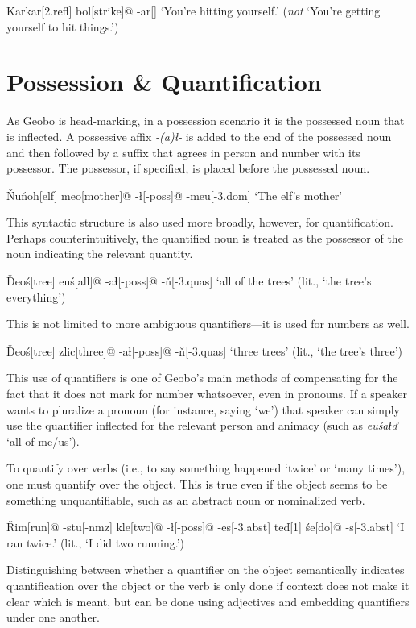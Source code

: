 \documentclass[a4paper,11pt,oneside,openany]{memoir}
\newcommand{\vd}{ď}
\newcommand{\vn}{ň}
\newcommand{\vD}{Ď}
\newcommand{\vR}{Ř}
\newcommand{\vN}{Ň}
\newcommand{\dbl}{ⱡ}
\begin{document}
\ex
\begingl
Karkar[\sc 2.refl]
bol[strike]@
-ar[]
\glft  `You're hitting yourself.' (\emph{not} `You're getting yourself to hit things.')
\endgl
\xe

\section{Possession \& Quantification}

As Geobo{\engma} is head-marking, in a possession scenario it is the possessed noun that is inflected. A possessive affix \textit{-(a)\l-} is added to the end of the possessed noun and then followed by a suffix that agrees in person and number with its possessor. The possessor, if specified, is placed before the possessed noun.

\ex
\begingl
\vN u\'noh[elf]
meo[mother]@
-\l[\sc -poss]@
-meu[\sc -3.dom]
\glft  `The elf's mother'
\endgl
\xe

This syntactic structure is also used more broadly, however, for quantification. Perhaps counterintuitively, the quantified noun is treated as the possessor of the noun indicating the relevant quantity.

\ex
\begingl
\vD eo\'s[tree]
eu\'s[all]@
-a\dbl[\sc -poss]@
-\vn[\sc -3.quas]
\glft `all of the trees' (lit., `the tree's everything')
\endgl
\xe

This is not limited to more ambiguous quantifiers---it is used for numbers as well.

\ex
\begingl
\vD eo\'s[tree]
zlic[three]@
-a\dbl[\sc -poss]@
-\vn[\sc -3.quas]
\glft `three trees' (lit., `the tree's three')
\endgl
\xe

This use of quantifiers is one of Geobo{\engma}'s main methods of compensating for the fact that it does not mark for number whatsoever, even in pronouns. If a speaker wants to pluralize a pronoun (for instance, saying `we') that speaker can simply use the quantifier inflected for the relevant person and animacy (such as \textit{eu\'sa\dbl\vd} `all of me/us').

To quantify over verbs (i.e., to say something happened `twice' or `many times'), one must quantify over the object. This is true even if the object seems to be something unquantifiable, such as an abstract noun or nominalized verb.

\ex
\begingl
\vR im[run]@
-stu[\sc -nmz]
kle[two]@
-\l[\sc -poss]@
-es[\sc -3.abst]
te{\vd}[1]
\'se[do]@
-s[\sc -3.abst]
\glft `I ran twice.' (lit., `I did two running.')
\endgl
\xe

Distinguishing between whether a quantifier on the object semantically indicates quantification over the object or the verb is only done if context does not make it clear which is meant, but can be done using adjectives and embedding quantifiers under one another.
\end{document}
